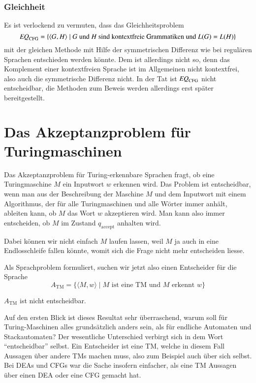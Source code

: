 \subsubsection{Gleichheit}
%
Es ist verlockend zu vermuten, dass das Gleichheitsproblem
\[
\text{\it EQ}_{\text{CFG}}=\{
\langle G,H\rangle\;|\; \text{$G$  und $H$ sind kontextfreie Grammatiken und $L(G)=L(H)$}
\}
\]
%
mit der gleichen Methode mit Hilfe der symmetrischen Differenz
wie bei regulären Sprachen entschieden werden könnte.
Dem ist
allerdings nicht so, denn das Komplement einer kontextfreien Sprache
ist im Allgemeinen nicht kontextfrei, also auch die symmetrische
Differenz nicht.
In der Tat ist 
$\text{\it EQ}_{\text{CFG}}$ nicht entscheidbar, die Methoden zum Beweis
werden allerdings erst später bereitgestellt.

\section{Das Akzeptanzproblem für Turingmaschinen}
%
Das Akzeptanzproblem für Turing-erkennbare Sprachen fragt, ob 
eine Turingmaschine $M$ ein Inputwort $w$ erkennen wird.
Das Problem ist entscheidbar, wenn man aus der Beschreibung
der Maschine $M$ und dem Inputwort mit einem Algorithmus, der
für alle Turingmaschinen und alle Wörter immer anhält, ableiten
kann, ob $M$ das Wort $w$ akzeptieren wird.
Man kann also immer
entscheiden, ob $M$ im Zustand $q_{\text{accept}}$ anhalten wird.

Dabei können wir nicht einfach $M$ laufen lassen, weil $M$
ja auch in eine Endlosschleife fallen könnte, womit sich die
Frage nicht mehr entscheiden liesse.

Als Sprachproblem formuliert, suchen wir jetzt also einen
Entscheider für die Sprache
\[
A_{\text{TM}}=\{
\langle M,w\rangle\;|\; \text{$M$ ist eine TM und $M$ erkennt $w$}
\}
\]
%

\begin{satz}
\label{ATM}
$A_{\text{TM}}$ ist nicht entscheidbar.
\end{satz}

Auf den ersten Blick ist dieses Resultat sehr überraschend, warum
soll für Turing-Maschinen alles grundsätzlich anders sein, als
für endliche Automaten und Stackautomaten? Der wesentliche Unterschied
verbirgt sich in dem Wort ``entscheidbar'' selbst.
Ein Entscheider ist eine
TM, welche in diesem Fall Aussagen über andere TMs machen muss, also
zum Beispiel auch über sich selbst.
Bei DEAs und CFGs war die Sache
insofern einfacher, als eine TM Aussagen über einen DEA oder eine
CFG gemacht hat.

